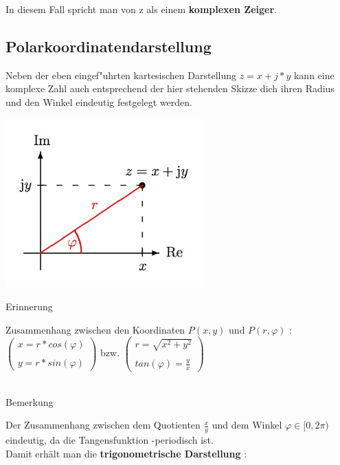		In diesem Fall spricht man von z als einem \textbf{komplexen Zeiger}.\\

	\subsection{Polarkoordinatendarstellung}

		Neben der eben eingef"uhrten kartesischen Darstellung $z =x+j*y$ kann eine komplexe Zahl auch entsprechend der hier stehenden Skizze dich ihren Radius  und den Winkel  eindeutig festgelegt werden.

		\includegraphics[width=3in]{kap6/komplexezahlen4}

		\begin{Bemerkung}
		Erinnerung\\
		\end{Bemerkung}

		Zusammenhang zwischen den Koordinaten $P(x,y)$ und $P(r,\varphi)$ :\\

		$
		\begin{pmatrix}
		x=r*cos(\varphi)\\
		\\
		y=r*sin(\varphi)
		\end{pmatrix}
		$
		bzw.
		$
		\begin{pmatrix}
		r= \sqrt{x^2+y^2}\\
		\\
		tan(\varphi) = \frac{y}{x}
		\end{pmatrix}
		$
		\\
		\\

		\begin{Bemerkung}
		Bemerkung\\
		\end{Bemerkung}

		Der Zusammenhang zwischen dem Quotienten $\frac{x}{y}$ und dem Winkel $\varphi \in [0,2\pi)$ eindeutig, da die Tangensfunktion -periodisch ist.\\
		Damit erhält man die \textbf{trigonometrische Darstellung} :\\


